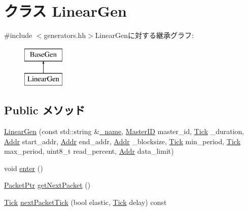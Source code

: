 \hypertarget{classLinearGen}{
\section{クラス LinearGen}
\label{classLinearGen}
}


{\ttfamily \#include $<$generators.hh$>$}LinearGenに対する継承グラフ:\begin{figure}[H]
\begin{center}
\leavevmode
\includegraphics[height=2cm]{classLinearGen}
\end{center}
\end{figure}
\subsection*{Public メソッド}
\begin{DoxyCompactItemize}
\item 
\hyperlink{classLinearGen_a8b696a23a093c2b9afcdf1826af1966a}{LinearGen} (const std::string \&\hyperlink{classBaseGen_a1b003dc5cfce1a4d8f9a0c4b9b589045}{\_\-name}, \hyperlink{request_8hh_ac366b729262fd8e7cbd3283da6f775cf}{MasterID} master\_\-id, \hyperlink{base_2types_8hh_a5c8ed81b7d238c9083e1037ba6d61643}{Tick} \_\-duration, \hyperlink{base_2types_8hh_af1bb03d6a4ee096394a6749f0a169232}{Addr} start\_\-addr, \hyperlink{base_2types_8hh_af1bb03d6a4ee096394a6749f0a169232}{Addr} end\_\-addr, \hyperlink{base_2types_8hh_af1bb03d6a4ee096394a6749f0a169232}{Addr} \_\-blocksize, \hyperlink{base_2types_8hh_a5c8ed81b7d238c9083e1037ba6d61643}{Tick} min\_\-period, \hyperlink{base_2types_8hh_a5c8ed81b7d238c9083e1037ba6d61643}{Tick} max\_\-period, uint8\_\-t read\_\-percent, \hyperlink{base_2types_8hh_af1bb03d6a4ee096394a6749f0a169232}{Addr} data\_\-limit)
\item 
void \hyperlink{classLinearGen_a2759dad6560aaf485b16356d7142d69d}{enter} ()
\item 
\hyperlink{classPacket}{PacketPtr} \hyperlink{classLinearGen_a938aa9841a9a62a776afbd0768af5379}{getNextPacket} ()
\item 
\hyperlink{base_2types_8hh_a5c8ed81b7d238c9083e1037ba6d61643}{Tick} \hyperlink{classLinearGen_a65f805b54c24ac3ce0a37716de3e8abc}{nextPacketTick} (bool elastic, \hyperlink{base_2types_8hh_a5c8ed81b7d238c9083e1037ba6d61643}{Tick} delay) const 
\end{DoxyCompactItemize}
